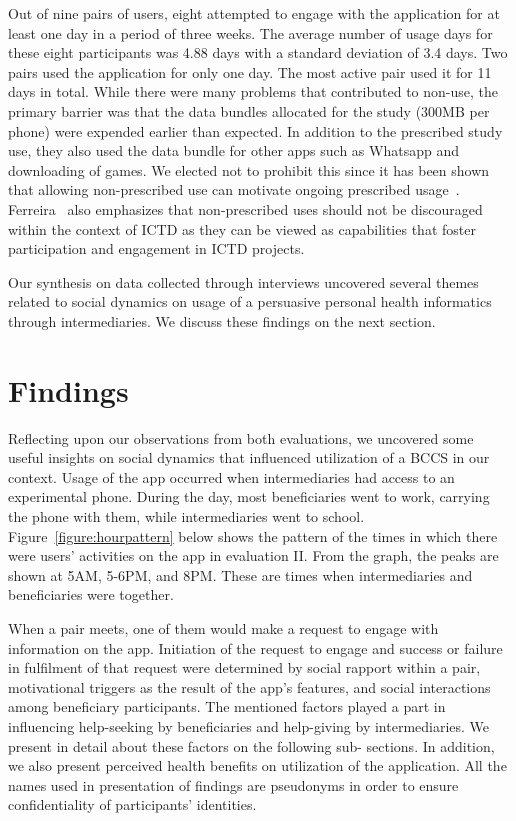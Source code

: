 \documentclass{sig-alternate}
\begin{document}
Out of nine pairs of users, eight attempted to engage with the application for
at least one day in a period of three weeks. The average number of usage days
for these eight participants was 4.88 days with a standard deviation of  3.4
days. Two pairs used the application for only one day. The most active pair
used it for 11 days in total. 
While there were many problems that contributed to non-use, the primary barrier
was that the data bundles allocated for the study (300MB per phone) were 
expended earlier than expected.
In addition to the prescribed study use, they also used the
data bundle for other apps such as Whatsapp and downloading of games. We 
elected not to prohibit this since it has been shown that allowing non-prescribed
use can motivate ongoing prescribed usage~\cite{Schwartz2013}.
Ferreira~\cite{ferrplay2015} also emphasizes that non-prescribed uses should not be
discouraged within the context of ICTD as they can be viewed as  capabilities
that foster participation and engagement in ICTD projects.

Our synthesis on data collected through interviews uncovered several themes
related to social dynamics on usage of a persuasive personal health
informatics through intermediaries. We discuss these findings on the next
section.

\section{Findings}

Reflecting upon our observations from both evaluations,  we uncovered some
useful insights on social dynamics that influenced utilization of a
BCCS in our context. Usage of the app occurred when intermediaries had access
to an experimental phone. During the day, most beneficiaries went to work, 
carrying the phone with them, while intermediaries went to school.
Figure~\ref{figure:hourpattern} below shows the pattern
of the times in which there were users' activities on the app in evaluation II.
From the graph, the peaks are shown at 5AM, 5-6PM, and 8PM. These are times
when intermediaries and beneficiaries were together.

When a pair meets, one of them would make a request to engage with
information on the app. Initiation of the request to engage and success or
failure in fulfilment of that request were determined by social rapport within a
pair, motivational triggers as the result of the app's features, and social
interactions among beneficiary participants. The mentioned factors played a
part in influencing help-seeking by beneficiaries and help-giving by
intermediaries. We present in detail about these factors on the following sub-
sections. In addition, we also present perceived health benefits on
utilization of the application. All the names used in presentation of findings
are pseudonyms in order to ensure confidentiality of participants' identities.
\end{document}
